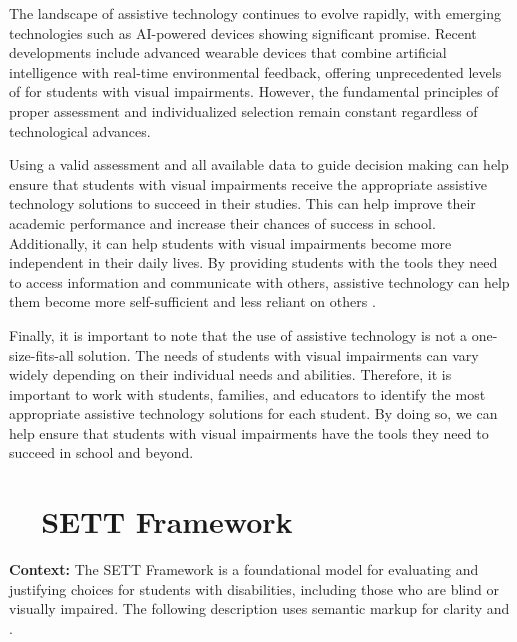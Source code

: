 The landscape of assistive technology continues to evolve rapidly, with emerging technologies such as AI-powered devices showing significant promise. Recent developments include advanced wearable devices that combine artificial intelligence with real-time environmental feedback, offering unprecedented levels of  for students with visual impairments. However, the fundamental principles of proper assessment and individualized selection remain constant regardless of technological advances.

Using a valid  assessment and all available data to guide decision making can help ensure that students with visual impairments receive the appropriate assistive technology solutions to succeed in their studies. This can help improve their academic performance and increase their chances of success in school. Additionally, it can help students with visual impairments become more independent in their daily lives. By providing students with the tools they need to access information and communicate with others, assistive technology can help them become more self-sufficient and less reliant on others \supercite{WATI2010}.

Finally, it is important to note that the use of assistive technology is not a one-size-fits-all solution. The  needs of students with visual impairments can vary widely depending on their individual needs and abilities. Therefore, it is important to work with students, families, and educators to identify the most appropriate assistive technology solutions for each student. By doing so, we can help ensure that students with visual impairments have the tools they need to succeed in school and beyond.

\section{~~SETT Framework}\label{app3:trouble41}

\noindent
\textbf{Context:} The SETT Framework is a foundational model for evaluating and justifying  choices for students with disabilities, including those who are blind or visually impaired. The following description uses semantic markup for clarity and .

